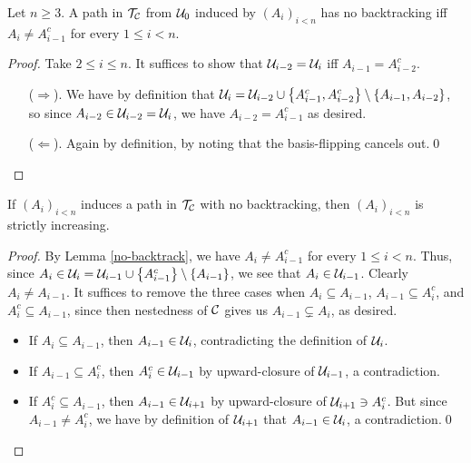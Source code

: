 \documentclass{amsart}
\begin{document}
    \begin{lemma}\label{no-backtrack}
        Let $n\geq3$. A path in $\mathcal{T}_{\mathcal{C}}$ from $\mathcal{U}_0$ induced by $(A_i)_{i<n}$ has no backtracking iff $A_i\neq A_{i-1}^c$ for every $1\leq i<n$.
    \end{lemma}
    \begin{proof}
        Take $2\leq i\leq n$. It suffices to show that $\mathcal{U}_{i-2}=\mathcal{U}_i$ iff $A_{i-1}=A_{i-2}^c$.
        \begin{itemize}
            \item[($\Rightarrow$).] We have by definition that $\mathcal{U}_i=\mathcal{U}_{i-2}\cup\left\{A_{i-1}^c,A_{i-2}^c\right\}\setminus\left\{A_{i-1},A_{i-2}\right\}$, so since $A_{i-2}\in\mathcal{U}_{i-2}=\mathcal{U}_i$, we have $A_{i-2}=A_{i-1}^c$ as desired.
            \item[($\Leftarrow$).] Again by definition, by noting that the basis-flipping cancels out.\qed
        \end{itemize}
    \end{proof}

    \begin{lemma}\label{strictly-inc}
        If $(A_i)_{i<n}$ induces a path in $\mathcal{T}_{\mathcal{C}}$ with no backtracking, then $(A_i)_{i<n}$ is strictly increasing.
    \end{lemma}
    \begin{proof}
        By Lemma \ref{no-backtrack}, we have $A_i\neq A_{i-1}^c$ for every $1\leq i<n$. Thus, since $A_i\in\mathcal{U}_i=\mathcal{U}_{i-1}\cup\left\{A_{i-1}^c\right\}\setminus\left\{A_{i-1}\right\}$, we see that $A_i\in\mathcal{U}_{i-1}$. Clearly $A_i\neq A_{i-1}$. It suffices to remove the three cases when $A_i\subseteq A_{i-1}$, $A_{i-1}\subseteq A_i^c$, and $A_i^c\subseteq A_{i-1}$, since then nestedness of $\mathcal{C}$ gives us $A_{i-1}\subsetneq A_i$, as desired.
        \begin{itemize}
            \item If $A_i\subseteq A_{i-1}$, then $A_{i-1}\in\mathcal{U}_i$, contradicting the definition of $\mathcal{U}_i$.
            \item If $A_{i-1}\subseteq A_i^c$, then $A_i^c\in\mathcal{U}_{i-1}$ by upward-closure of $\mathcal{U}_{i-1}$, a contradiction.
            \item If $A_i^c\subseteq A_{i-1}$, then $A_{i-1}\in\mathcal{U}_{i+1}$ by upward-closure of $\mathcal{U}_{i+1}\ni A_i^c$. But since $A_{i-1}\neq A_i^c$, we have by definition of $\mathcal{U}_{i+1}$ that $A_{i-1}\in\mathcal{U}_i$, a contradiction.\qed
        \end{itemize}
    \end{proof}
\end{document}
